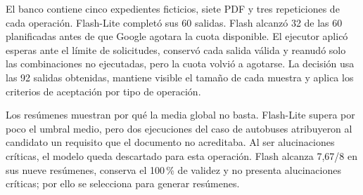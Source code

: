 El banco contiene cinco expedientes ficticios, siete PDF y tres repeticiones de
cada operación. Flash-Lite completó sus 60 salidas. Flash alcanzó 32 de las 60
planificadas antes de que Google agotara la cuota disponible. El ejecutor aplicó
esperas ante el límite de solicitudes, conservó cada salida válida y reanudó
solo las combinaciones no ejecutadas, pero la cuota volvió a agotarse. La
decisión usa las 92 salidas obtenidas, mantiene visible el tamaño de cada
muestra y aplica los criterios de aceptación por tipo de operación.

\begin{table}[H]
  \centering
  \scriptsize
  \caption{Resultados experimentales desglosados por operación y modelo.}
  \label{tab:ai-results-by-operation}
\end{table}

Los resúmenes muestran por qué la media global no basta. Flash-Lite supera por
poco el umbral medio, pero dos ejecuciones del caso de autobuses atribuyeron al
candidato un requisito que el documento no acreditaba. Al ser alucinaciones
críticas, el modelo queda descartado para esta operación. Flash alcanza 7,67/8
en sus nueve resúmenes, conserva el 100\,\% de validez y no presenta
alucinaciones críticas; por ello se selecciona para generar resúmenes.

